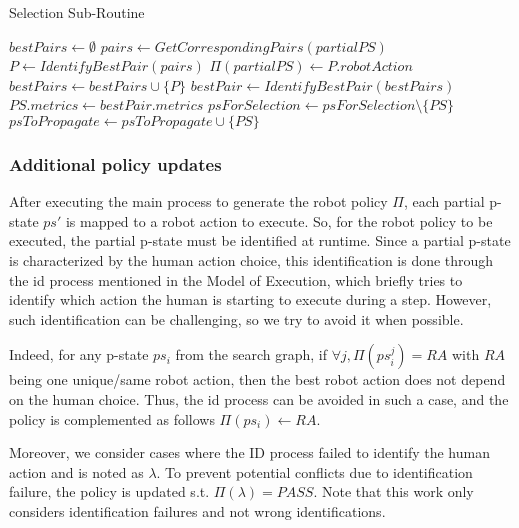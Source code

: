 \begin{algorithm}
\caption{Selection Sub-Routine}\label{alg:selection}
\begin{algorithmic}[1]

        \State $bestPairs \gets \emptyset$
            \State $pairs \gets GetCorrespondingPairs(partialPS)$
            \State $P \gets IdentifyBestPair(pairs)$ 
            \State $\Pi(partialPS) \gets P.robotAction$
            \State $bestPairs \gets bestPairs \cup \{P\}$
        \EndFor
        \State 
        \State $bestPair \gets IdentifyBestPair(bestPairs)$
        \State 
        \State $PS.metrics \gets bestPair.metrics$
        \State $psForSelection \gets psForSelection \setminus \{PS\}$
        \State $psToPropagate \gets psToPropagate \cup \{PS\}$
    \EndIf
\EndFor

\end{algorithmic}
\end{algorithm}

    \subsubsection{Additional policy updates}

After executing the main process to generate the robot policy $\Pi$, each partial p-state $ps'$ is mapped to a robot action to execute. So, for the robot policy to be executed, the partial p-state must be identified at runtime. 
Since a partial p-state is characterized by the human action choice, this identification is done through the \acrshort{id} process mentioned in the Model of Execution, which briefly tries to identify which action the human is starting to execute during a step. However, such identification can be challenging, so we try to avoid it when possible. 

Indeed, for any p-state $ps_i$ from the search graph, if $\forall j, \Pi(ps_i^j) = RA$ with $RA$ being one unique/same robot action, then the best robot action does not depend on the human choice. Thus, the \acrshort{id} process can be avoided in such a case, and the policy is complemented as follows $\Pi(ps_i) \gets RA$.

Moreover, we consider cases where the ID process failed to identify the human action and is noted as $\lambda$. To prevent potential conflicts due to identification failure, the policy is updated s.t. $\Pi(\lambda) = PASS$.
Note that this work only considers identification failures and not wrong identifications. 

